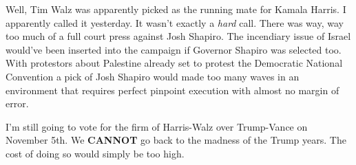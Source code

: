 Well, Tim Walz was apparently picked as the running mate for Kamala
Harris. I apparently called it yesterday. It wasn't exactly a
\emph{hard} call. There was way, way too much of a full court press
against Josh Shapiro. The incendiary issue of Israel would've been
inserted into the campaign if Governor Shapiro was selected too. With
protestors about Palestine already set to protest the Democratic
National Convention a pick of Josh Shapiro would made too many waves in
an environment that requires perfect pinpoint execution with almost no
margin of error.

I'm still going to vote for the firm of Harris-Walz over Trump-Vance on
November 5th. We \textbf{CANNOT} go back to the madness of the Trump
years. The cost of doing so would simply be too high.
